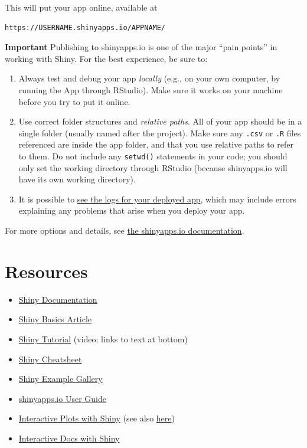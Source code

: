 \documentclass[]{book}
\providecommand{\tightlist}{%
  \setlength{\itemsep}{0pt}\setlength{\parskip}{0pt}}
\theoremstyle{definition}
\theoremstyle{definition}
\theoremstyle{remark}
\begin{document}
This will put your app online, available at

\begin{verbatim}
https://USERNAME.shinyapps.io/APPNAME/
\end{verbatim}

\textbf{Important} Publishing to shinyapps.io is one of the major ``pain
points'' in working with Shiny. For the best experience, be sure to:

\begin{enumerate}
\def\labelenumi{\arabic{enumi}.}
\item
  Always test and debug your app \emph{locally} (e.g., on your own
  computer, by running the App through RStudio). Make sure it works on
  your machine before you try to put it online.
\item
  Use correct folder structures and \emph{relative paths}. All of your
  app should be in a single folder (usually named after the project).
  Make sure any \texttt{.csv} or \texttt{.R} files referenced are inside
  the app folder, and that you use relative paths to refer to them. Do
  not include any \texttt{setwd()} statements in your code; you should
  only set the working directory through RStudio (because shinyapps.io
  will have its own working directory).
\item
  It is possible to
  \href{http://docs.rstudio.com/shinyapps.io/applications.html\#logging}{see
  the logs for your deployed app}, which may include errors explaining
  any problems that arise when you deploy your app.
\end{enumerate}

For more options and details, see
\href{http://docs.rstudio.com/shinyapps.io/index.html}{the shinyapps.io
documentation}.

\section*{Resources}\label{resources-14}


\begin{itemize}
\tightlist
\item
  \href{http://shiny.rstudio.com/articles/}{Shiny Documentation}
\item
  \href{http://shiny.rstudio.com/articles/basics.html}{Shiny Basics
  Article}
\item
  \href{http://shiny.rstudio.com/tutorial/}{Shiny Tutorial} (video;
  links to text at bottom)
\item
  \href{https://www.rstudio.com/wp-content/uploads/2016/01/shiny-cheatsheet.pdf}{Shiny
  Cheatsheet}
\item
  \href{http://shiny.rstudio.com/gallery/}{Shiny Example Gallery}
\item
  \href{http://docs.rstudio.com/shinyapps.io/index.html}{shinyapps.io
  User Guide}
\item
  \href{http://shiny.rstudio.com/articles/plot-interaction.html}{Interactive
  Plots with Shiny} (see also
  \href{https://blog.rstudio.org/2015/06/16/shiny-0-12-interactive-plots-with-ggplot2/}{here})
\item
  \href{https://shiny.rstudio.com/articles/interactive-docs.html}{Interactive
  Docs with Shiny}
\end{itemize}
\end{document}
